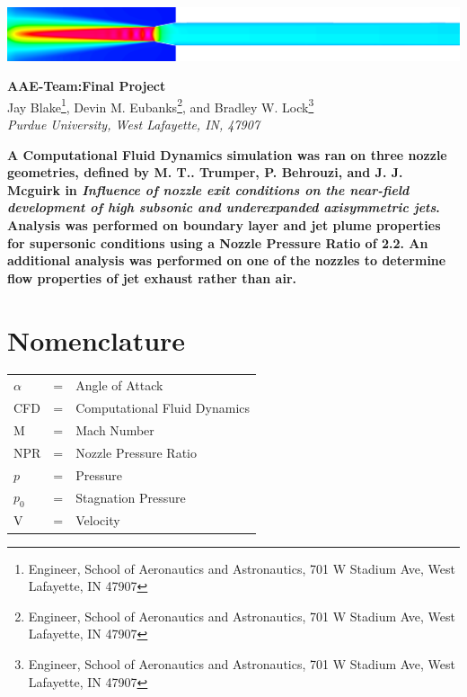 \documentclass[12pt]{article} %
\title{\classnumber\:\reportnumber}
\author{Jay Blake\\Devin Eubanks\\Brad Lock\\Purdue University}
\newcommand{\classnumber}{AAE\:412\:-\:Team\:32:}
\newcommand{\reportnumber}{Final Project}
\begin{document}
\maketitle
\vspace{2in}
\begin{center}
    \includegraphics[width=\linewidth]{CoverPicture.png}
\end{center}
\clearpage
\begin{center}
{\Large\textbf{\classnumber\:\reportnumber}}\\
\vspace*{24pt}
Jay Blake\footnote{Engineer, School of Aeronautics and Astronautics, 701 W Stadium Ave, West Lafayette, IN 47907}, Devin M. Eubanks\footnote{Engineer, School of Aeronautics and Astronautics, 701 W Stadium Ave, West Lafayette, IN 47907}, and Bradley W. Lock\footnote{Engineer, School of Aeronautics and Astronautics, 701 W Stadium Ave, West Lafayette, IN 47907}\\
\textit{Purdue University, West Lafayette, IN, 47907}
\end{center}
\vspace*{48pt}
\textbf{\hspace{36pt}A Computational Fluid Dynamics simulation was ran on three nozzle geometries, defined by M. T.. Trumper, P. Behrouzi, and J. J. Mcguirk in \textit{Influence  of  nozzle  exit  conditions on  the  near-field  development  of  high  subsonic  and  underexpanded  axisymmetric  jets}. Analysis was performed on boundary layer and jet plume properties for supersonic conditions using a Nozzle Pressure Ratio of 2.2. An additional analysis was performed on one of the nozzles to determine flow properties of jet exhaust rather than air.}
\vspace*{36pt}
\section*{Nomenclature}
\begin{table}[ht]
    \begin{tabular}{l c l}
       $\alpha$&=&Angle of Attack\\
       CFD&=&Computational Fluid Dynamics\\
         M&=&Mach Number\\
         NPR&=&Nozzle Pressure Ratio\\
         $p$&=&Pressure\\
         $p_0$&=&Stagnation Pressure\\
         V&=&Velocity
    \end{tabular}
    \label{tab:nomenclature}
\end{table}
\end{document}
